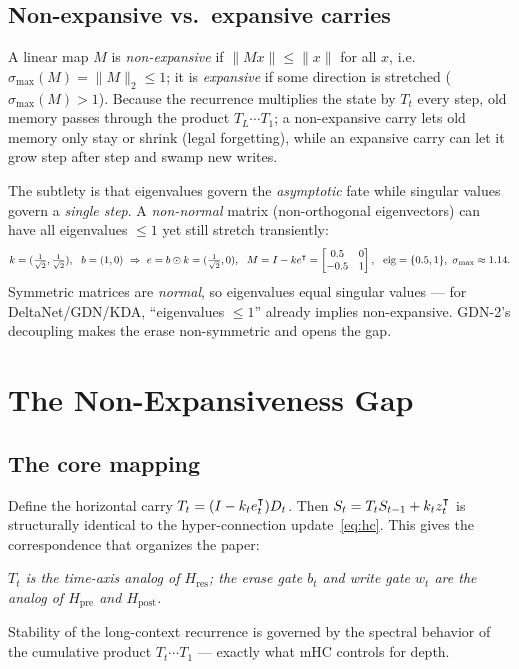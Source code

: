 \documentclass[11pt,letterpaper,logo]{yalearxiv}
\newcommand{\smax}{\sigma_{\max}}
\newcommand{\Tcarry}{T}          %
\newcommand{\Hres}{H_{\mathrm{res}}}
\newcommand{\Hpre}{H_{\mathrm{pre}}}
\newcommand{\Hpost}{H_{\mathrm{post}}}
\begin{document}
\subsection{Non-expansive vs.\ expansive carries}
\label{sec:sigmax}

A linear map $M$ is \emph{non-expansive} if $\|Mx\| \le \|x\|$ for all $x$, i.e.\
$\smax(M) = \|M\|_2 \le 1$; it is \emph{expansive} if some direction is stretched
($\smax(M) > 1$). Because the recurrence multiplies the state by $\Tcarry_t$ every
step, old memory passes through the product $\Tcarry_L \cdots \Tcarry_1$; a
non-expansive carry lets old memory only stay or shrink (legal forgetting), while an
expansive carry can let it grow step after step and swamp new writes.

The subtlety is that eigenvalues govern the \emph{asymptotic} fate while singular
values govern a \emph{single step}. A \emph{non-normal} matrix (non-orthogonal
eigenvectors) can have all eigenvalues $\le 1$ yet still stretch transiently:
\begin{equation}
  k=(\tfrac1{\sqrt2},\tfrac1{\sqrt2}),\ \ b=(1,0)
  \ \Rightarrow\ e = b\odot k = (\tfrac1{\sqrt2},0),\ \
  M = I - k e^{\tr} = \begin{bmatrix} 0.5 & 0\\ -0.5 & 1\end{bmatrix},\ \
  \text{eig}=\{0.5,1\},\ \smax\approx 1.14 .
  \label{eq:nonnormal-ex}
\end{equation}
Symmetric matrices are \emph{normal}, so eigenvalues equal singular values --- for
DeltaNet/GDN/KDA, ``eigenvalues $\le 1$'' already implies non-expansive. GDN-2's
decoupling makes the erase non-symmetric and opens the gap.


\section{The Non-Expansiveness Gap}
\label{sec:gap}

\subsection{The core mapping}
Define the horizontal carry $\Tcarry_t = (I - k_t e_t^{\tr}) D_t$. Then
$S_t = \Tcarry_t S_{t-1} + k_t z_t^{\tr}$ is structurally identical to the
hyper-connection update~\eqref{eq:hc}. This gives the correspondence that organizes
the paper:
\begin{center}
\emph{$\Tcarry_t$ is the time-axis analog of $\Hres$; the erase gate $b_t$ and write
gate $w_t$ are the analog of $\Hpre$ and $\Hpost$.}
\end{center}
Stability of the long-context recurrence is governed by the spectral behavior of the
cumulative product $\Tcarry_t \cdots \Tcarry_1$ --- exactly what mHC controls for
depth.
\end{document}
